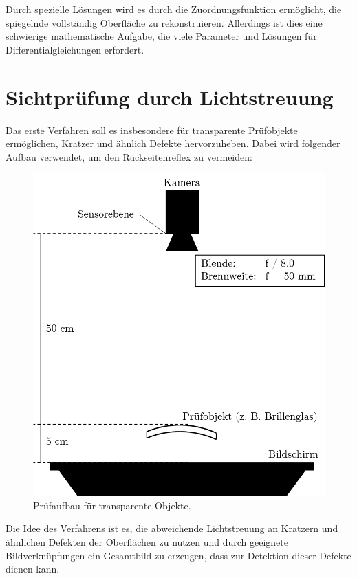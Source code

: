 \documentclass[ngerman,11pt,twocolumn,a4paper]{article}
\begin{document}
	Durch spezielle Lösungen wird es durch die Zuordnungsfunktion ermöglicht, die spiegelnde vollständig Oberfläche zu rekonstruieren.
	Allerdings ist dies eine schwierige mathematische Aufgabe, die viele Parameter und Lösungen für Differentialgleichungen erfordert.
	
	\section{Sichtprüfung durch Lichtstreuung} \label{sec:sichtpruefungDurchLichtstreuung}
	Das erste Verfahren soll es insbesondere für transparente Prüfobjekte ermöglichen, Kratzer und ähnlich Defekte hervorzuheben.
	Dabei wird folgender Aufbau verwendet, um den Rückseitenreflex zu vermeiden:
	\begin{figure}[H]
		\centering
		\includegraphics[width=0.7\columnwidth]{aufbau}
		\caption{Prüfaufbau für transparente Objekte.}
		\label{img:aufbau}
	\end{figure}
	
	Die Idee des Verfahrens ist es, die abweichende Lichtstreuung an Kratzern und ähnlichen Defekten der Oberflächen zu nutzen und durch geeignete Bildverknüpfungen ein Gesamtbild zu erzeugen, dass zur Detektion dieser Defekte dienen kann.
	
\end{document}
